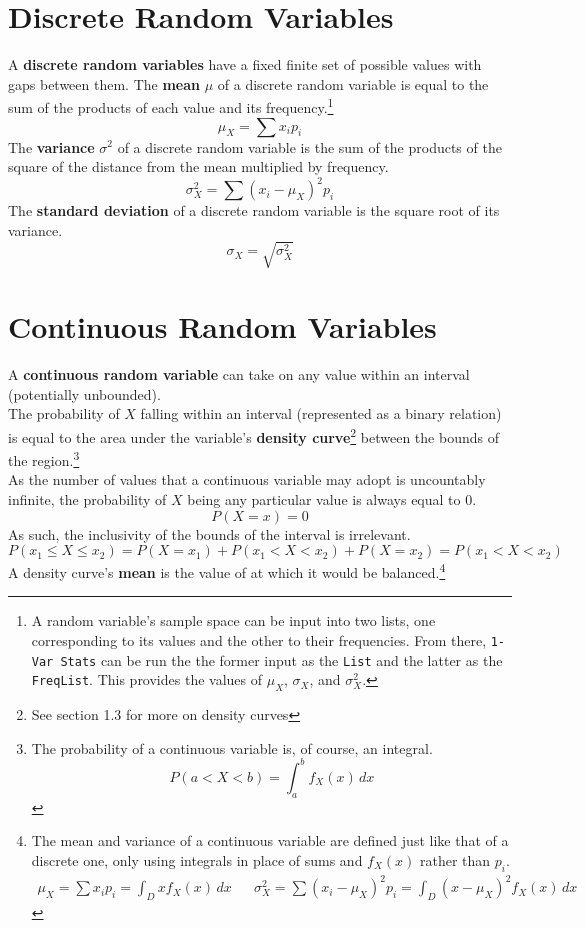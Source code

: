 \documentclass[../AP_Statistics.tex]{subfiles}
\begin{document}
		\section{Discrete Random Variables}
			A \textbf{discrete random variables} have a fixed finite set of possible values with gaps between them.
			The \textbf{mean} $\mu$ of a discrete random variable is equal to the sum of the products of each value and its frequency.\footnote{A random variable's sample space can be input into two lists, one corresponding to its values and the other to their frequencies. From there, \texttt{1-Var Stats} can be run the the former input as the \texttt{List} and the latter as the \texttt{FreqList}. This provides the values of $\mu_X$, $\sigma_X$, and $\sigma_X^2$.}
			$$\mu_X = \sum x_ip_i$$
			The \textbf{variance} $\sigma^2$ of a discrete random variable is the sum of the products of the square of the distance from the mean multiplied by frequency.
			$$\sigma_X^2 = \sum(x_i - \mu_X)^2p_i$$
			The \textbf{standard deviation} of a discrete random variable is the square root of its variance.
			$$\sigma_X = \sqrt{\sigma_X^2}$$
		\section{Continuous Random Variables}
			A \textbf{continuous random variable} can take on any value within an interval (potentially unbounded). \\
			The probability of $X$ falling within an interval (represented as a binary relation) is equal to the area under the variable's \textbf{density curve}\footnote{See section 1.3 for more on density curves} between the bounds of the region.\footnote{The probability of a continuous variable is, of course, an integral.$$P(a < X < b) = \int_a^bf_X(x)\,dx$$} \\
			As the number of values that a continuous variable may adopt is uncountably infinite, the probability of $X$ being any particular value is always equal to 0.
			$$P(X = x) = 0$$
			As such, the inclusivity of the bounds of the interval is irrelevant.
			$$P(x_1 \le X \le x_2) = P(X = x_1) + P(x_1 < X < x_2) + P(X = x_2) = P(x_1 < X < x_2)$$
			A density curve's \textbf{mean} is the value of at which it would be balanced.\footnote{The mean and variance of a continuous variable are defined just like that of a discrete one, only using integrals in place of sums and $f_X(x)$ rather than $p_i$.\begin{align*}\mu_X = \sum x_ip_i = \int_Dxf_X(x)\,dx && \sigma_X^2 = \sum(x_i - \mu_X)^2p_i = \int_D(x - \mu_X)^2f_X(x)\,dx \end{align*}} \\
\end{document}
